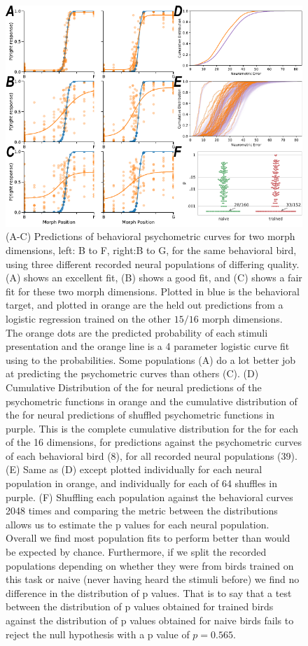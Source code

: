 \begin{figure}[tbp] 
  \centering
  \includegraphics[width=114mm]{figures/fig08_neurometric.pdf}
  \caption[Predicting psychometric curves from neural population activity]
{
(A-C)   Predictions of behavioral psychometric curves for two morph dimensions, left: B to F, right:B to G, for the same behavioral bird, using three different recorded neural populations of differing quality. (A) shows an excellent fit, (B) shows a good fit, and (C) shows a fair fit for these two morph dimensions. Plotted in blue is the behavioral target, and plotted in orange are the held out predictions from a logistic regression trained on the other $15/16$ morph dimensions. The orange dots are the predicted probability of each stimuli presentation and the orange line is a 4 parameter logistic curve fit using \MSE to the probabilities. Some populations (A) do a lot better job at predicting the psychometric curves than others (C).
(D) Cumulative Distribution of the \MSE for neural predictions of the psychometric functions in orange and the cumulative distribution of the \MSE for neural predictions of shuffled psychometric functions in purple. This is the complete cumulative distribution for the \MSE for each of the 16 dimensions, for predictions against the psychometric curves of each behavioral bird (8), for all recorded neural populations (39).
(E) Same as (D) except plotted individually for each neural population in orange, and individually for each of 64 shuffles in purple.
(F) Shuffling each population against the behavioral curves 2048 times and comparing the \KS metric between the distributions allows us to estimate the p values for each neural population. Overall we find most population fits to perform better than would be expected by chance. Furthermore, if we split the recorded populations depending on whether they were from birds trained on this task or naive (never having heard the stimuli before) we find no difference in the distribution of p values. That is to say that a \KS test between the distribution of p values obtained for trained birds against the distribution of p values obtained for naive birds fails to reject the null hypothesis with a p value of $p=0.565$.
}
  \label{fig:neurometric}
\end{figure}